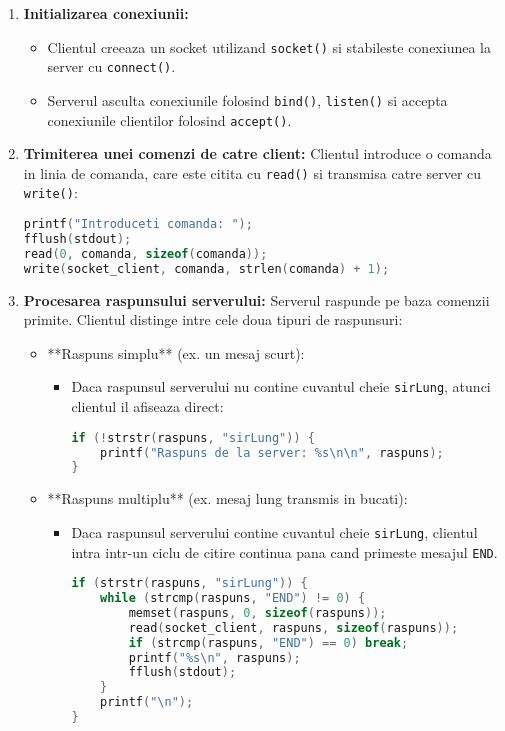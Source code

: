 \documentclass[runningheads]{llncs}
\begin{document}
\begin{enumerate}[label=\alph*)]
    \item \textbf{Initializarea conexiunii:}
    \begin{itemize}
        \item Clientul creeaza un socket utilizand \texttt{socket()} si stabileste conexiunea la server cu \texttt{connect()}.
        \item Serverul asculta conexiunile folosind \texttt{bind()}, \texttt{listen()} si accepta conexiunile clientilor folosind \texttt{accept()}.
    \end{itemize}

    \vspace{2cm}
    \item \textbf{Trimiterea unei comenzi de catre client:}
    Clientul introduce o comanda in linia de comanda, care este citita cu \texttt{read()} si transmisa catre server cu \texttt{write()}:
    \begin{lstlisting}[language=C, basicstyle=\ttfamily\small]
printf("Introduceti comanda: ");
fflush(stdout);
read(0, comanda, sizeof(comanda));
write(socket_client, comanda, strlen(comanda) + 1);
    \end{lstlisting}
    \item \textbf{Procesarea raspunsului serverului:}
    Serverul raspunde pe baza comenzii primite. Clientul distinge intre cele doua tipuri de raspunsuri:
    \begin{itemize}
        \item **Raspuns simplu** (ex. un mesaj scurt):
        \begin{itemize}
            \item Daca raspunsul serverului nu contine cuvantul cheie \texttt{sirLung}, atunci clientul il afiseaza direct:
            \begin{lstlisting}[language=C, basicstyle=\ttfamily\small]
if (!strstr(raspuns, "sirLung")) {
    printf("Raspuns de la server: %s\n\n", raspuns);
}
            \end{lstlisting}
        \end{itemize}
        
        \item **Raspuns multiplu** (ex. mesaj lung transmis in bucati):
        \begin{itemize}
            \item Daca raspunsul serverului contine cuvantul cheie \texttt{sirLung}, clientul intra intr-un ciclu de citire continua pana cand primeste mesajul \texttt{END}. 
            \begin{lstlisting}[language=C, basicstyle=\ttfamily\small]
if (strstr(raspuns, "sirLung")) {
    while (strcmp(raspuns, "END") != 0) {
        memset(raspuns, 0, sizeof(raspuns));
        read(socket_client, raspuns, sizeof(raspuns));
        if (strcmp(raspuns, "END") == 0) break;
        printf("%s\n", raspuns);
        fflush(stdout);
    }
    printf("\n");
}
            \end{lstlisting}
        \end{itemize}
    \end{itemize}


\end{enumerate}
\end{document}
